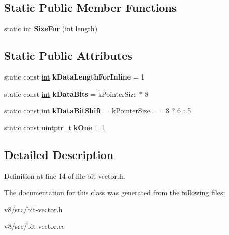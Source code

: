 \subsection*{Static Public Member Functions}
\begin{DoxyCompactItemize}
\item 
\mbox{\label{classv8_1_1internal_1_1BitVector_adc077289e0cf2fa2744184695a771c6c}} 
static \mbox{\hyperlink{classint}{int}} {\bfseries Size\+For} (\mbox{\hyperlink{classint}{int}} length)
\end{DoxyCompactItemize}
\subsection*{Static Public Attributes}
\begin{DoxyCompactItemize}
\item 
\mbox{\label{classv8_1_1internal_1_1BitVector_a9e7b355fb47f267c628ea2b2b4134073}} 
static const \mbox{\hyperlink{classint}{int}} {\bfseries k\+Data\+Length\+For\+Inline} = 1
\item 
\mbox{\label{classv8_1_1internal_1_1BitVector_ad00352de5ea7bd99f60f2e3441f3c0c9}} 
static const \mbox{\hyperlink{classint}{int}} {\bfseries k\+Data\+Bits} = k\+Pointer\+Size $\ast$ 8
\item 
\mbox{\label{classv8_1_1internal_1_1BitVector_af8348444ed8aeb66a13a991e81a86b41}} 
static const \mbox{\hyperlink{classint}{int}} {\bfseries k\+Data\+Bit\+Shift} = k\+Pointer\+Size == 8 ? 6 \+: 5
\item 
\mbox{\label{classv8_1_1internal_1_1BitVector_abd12b43dc714a1b894ab4130edae1d57}} 
static const \mbox{\hyperlink{classuintptr__t}{uintptr\+\_\+t}} {\bfseries k\+One} = 1
\end{DoxyCompactItemize}


\subsection{Detailed Description}


Definition at line 14 of file bit-\/vector.\+h.



The documentation for this class was generated from the following files\+:\begin{DoxyCompactItemize}
\item 
v8/src/bit-\/vector.\+h\item 
v8/src/bit-\/vector.\+cc\end{DoxyCompactItemize}
